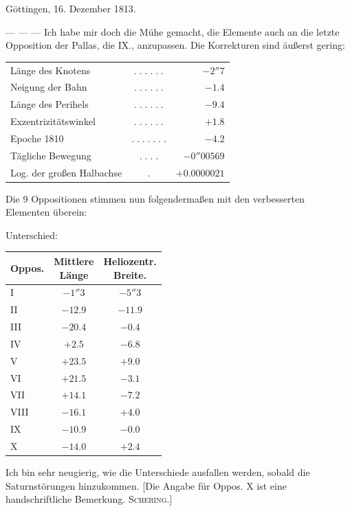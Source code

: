 \begin{flushright}\leavevmode{}Göttingen, 16. Dezember 1813.\end{flushright}
\noindent --- --- --- Ich habe mir doch die Mühe gemacht, die Elemente auch an die letzte Opposition der Pallas, die IX., anzupassen. Die Korrekturen sind äußerst gering:
\begin{center}\fontsize{10}{12}\selectfont\setlength{\tabcolsep}{2pt}\renewcommand{\arraystretch}{1.15}\begin{tabular}{lcr}
Länge des Knotens & $.\;.\;.\;.\;.\;.$ & $-2''7$\\
Neigung der Bahn & $.\;.\;.\;.\;.\;.$ & $-1.4$\\
Länge des Perihels & $.\;.\;.\;.\;.\;.$ & $-9.4$\\
Exzentrizitätswinkel & $.\;.\;.\;.\;.\;.$ & $+1.8$\\
Epoche 1810 & $.\;.\;.\;.\;.\;.\;.$ & $-4.2$\\
Tägliche Bewegung & $.\;.\;.\;.$ & $-0''00569$\\
Log. der großen Halbachse & $.$ & $+0.0000021$\\
\end{tabular}\end{center}
\par\indent Die 9 Oppositionen stimmen nun folgendermaßen mit den verbesserten Elementen überein:
\begin{center}Unterschied:\end{center}
\begin{center}\fontsize{10}{12}\selectfont\setlength{\tabcolsep}{7pt}\renewcommand{\arraystretch}{1.15}\begin{tabular}{l|c|c}
Oppos. & \shortstack{Mittlere\\Länge} & \shortstack{Heliozentr.\\Breite.}\\\hline
I & $-1''3$ & $-5''3$\\
II & $-12.9$ & $-11.9$\\
III & $-20.4$ & $-0.4$\\
IV & $+2.5$ & $-6.8$\\
V & $+23.5$ & $+9.0$\\
VI & $+21.5$ & $-3.1$\\
VII & $+14.1$ & $-7.2$\\
VIII & $-16.1$ & $+4.0$\\
IX & $-10.9$ & $-0.0$\\
X & $-14.0$ & $+2.4$\\
\end{tabular}\end{center}
\par\indent Ich bin sehr neugierig, wie die Unterschiede ausfallen werden, sobald die Saturnstörungen hinzukommen. [Die Angabe für Oppos. X ist eine handschriftliche Bemerkung. \textsc{Schering}.]

